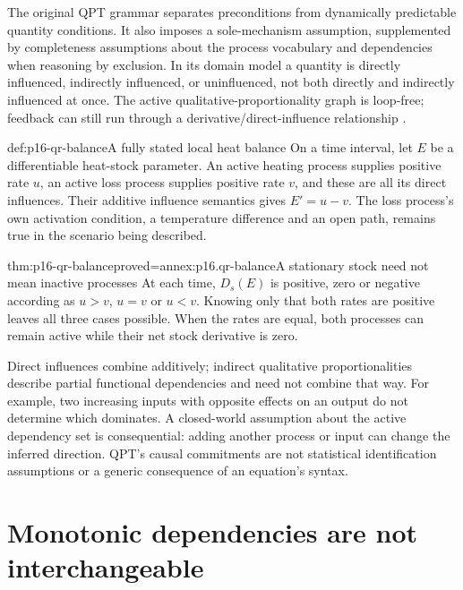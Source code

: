 The original QPT grammar separates preconditions from dynamically predictable
quantity conditions. It also imposes a sole-mechanism assumption, supplemented
by completeness assumptions about the process vocabulary and dependencies
when reasoning by exclusion. In its domain model a quantity is directly
influenced, indirectly influenced, or uninfluenced, not both directly and
indirectly influenced at once. The active qualitative-proportionality graph
is loop-free; feedback can still run through a derivative/direct-influence
relationship \cite[secs.~3.2--3.6]{Forbus1984QPT}.

\begin{hbdefinition}{def:p16-qr-balance}{A fully stated local heat balance}
On a time interval, let \(E\) be a differentiable heat-stock parameter.
An active heating process supplies positive rate \(u\), an active loss
process supplies positive rate \(v\), and these are all its direct influences.
Their additive influence semantics gives \(E'=u-v\). The loss process's
own activation condition, a temperature difference and an open path, remains
true in the scenario being described.
\end{hbdefinition}

\begin{hbtheorem}{thm:p16-qr-balance}{proved=annex:p16.qr-balance}{A stationary stock need not mean inactive processes}
At each time, \(D_s(E)\) is positive, zero or negative according as
\(u>v\), \(u=v\) or \(u<v\). Knowing only that both rates are
positive leaves all three cases possible. When the rates are equal, both
processes can remain active while their net stock derivative is zero.
\end{hbtheorem}

Direct influences combine additively; indirect qualitative proportionalities
describe partial functional dependencies and need not combine that way.
For example, two increasing inputs with opposite effects on an output do
not determine which dominates. A closed-world assumption about the active
dependency set is consequential: adding another process or input can change
the inferred direction. QPT's causal commitments are not statistical
identification assumptions or a generic consequence of an equation's syntax.

\section{Monotonic dependencies are not interchangeable}
\label{sec:p16-qr-monotonicity}

